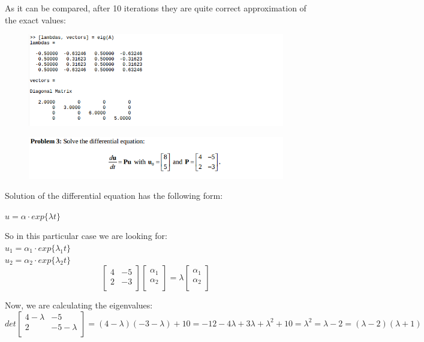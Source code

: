 \documentclass[eng,openany]{mgr}
\begin{document}
As it can be compared, after 10 iterations they are quite correct approximation of the exact values:
\begin{figure}[h]
\centering
\includegraphics[width=0.8\linewidth]{screenshot003}
\label{fig:screenshot003}
\end{figure}
\newpage
\begin{figure}[h]
\centering
\includegraphics[width=0.8\linewidth]{screenshot004}
\label{fig:screenshot004}
\end{figure}
Solution of the differential equation has the following form:
\begin{center}
$u = \alpha \cdot exp\{\lambda t\}$\\
\end{center}
So in this particular case we are looking for:\\
$u_1 = \alpha_1 \cdot exp\{\lambda_1 t\}$\\
$u_2 = \alpha_2 \cdot exp\{\lambda_2 t\}$
\[
\begin{bmatrix}
4& -5\\
2& -3\\
\end{bmatrix}
\begin{bmatrix}
\alpha_1\\
\alpha_2\\
\end{bmatrix}
= \lambda
\begin{bmatrix}
\alpha_1\\
\alpha_2\\
\end{bmatrix}
\]

Now, we are calculating the eigenvalues:
\[
det
\begin{bmatrix}
4-\lambda&-5 \\
2& -5-\lambda\\
\end{bmatrix}
= (4-\lambda)(-3-\lambda)+10 = -12 -4\lambda +3\lambda + \lambda^2 + 10 = \lambda^2 = \lambda -2 = (\lambda-2)(\lambda+1)
\]
\end{document}
